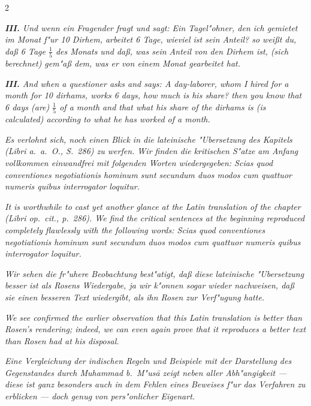 \documentclass[10pt,a4paper]{article}
\begin{document}
\begin{paracol}{2}
\switchcolumn*

\textit{\textbf{III.} Und wenn ein Fragender fragt und sagt: Ein Tagel"ohner, den ich gemietet im Monat f"ur 10 Dirhem, arbeitet 6 Tage, wieviel ist sein Anteil? so wei\ss{}t du, da\ss{} 6 Tage $\frac{1}{5}$ des Monats und da\ss{}, was sein Anteil von den Dirhem ist, (sich berechnet) gem"a\ss{} dem, was er von einem Monat gearbeitet hat.}

\switchcolumn

\textit{\textbf{III.} And when a questioner asks and says: A day-laborer, whom I hired for a month for 10 dirhams, works 6 days, how much is his share? then you know that 6 days (are) $\frac{1}{5}$ of a month and that what his share of the dirhams is (is calculated) according to what he has worked of a month.}

\switchcolumn*

\textit{Es verlohnt sich, noch einen Blick in die lateinische "Ubersetzung des Kapitels (Libri a.\ a.\ O., S.\ 286) zu werfen. Wir finden die kritischen S"atze am Anfang vollkommen einwandfrei mit folgenden Worten wiedergegeben: \textit{Scias quod conventiones negotiationis hominum sunt secundum duos modos cum quattuor numeris quibus interrogator loquitur.}}

\switchcolumn

\textit{It is worthwhile to cast yet another glance at the Latin translation of the chapter (Libri \textit{op.\ cit.}, p.\ 286). We find the critical sentences at the beginning reproduced completely flawlessly with the following words: \textit{Scias quod conventiones negotiationis hominum sunt secundum duos modos cum quattuor numeris quibus interrogator loquitur.}}

\switchcolumn*

\textit{Wir sehen die fr"uhere Beobachtung best"atigt, da\ss{} diese lateinische "Ubersetzung besser ist als Rosens Wiedergabe, ja wir k"onnen sogar wieder nachweisen, da\ss{} sie einen besseren Text wiedergibt, als ihn Rosen zur Verf"ugung hatte.}

\switchcolumn

\textit{We see confirmed the earlier observation that this Latin translation is better than Rosen's rendering; indeed, we can even again prove that it reproduces a better text than Rosen had at his disposal.}

\switchcolumn*

\textit{Eine Vergleichung der indischen Regeln und Beispiele mit der Darstellung des Gegenstandes durch Muhammad b.\ M"us\=a zeigt neben aller Abh"angigkeit --- diese ist ganz besonders auch in dem Fehlen eines Beweises f"ur das Verfahren zu erblicken --- doch genug von pers"onlicher Eigenart.}


\end{paracol}
\end{document}
